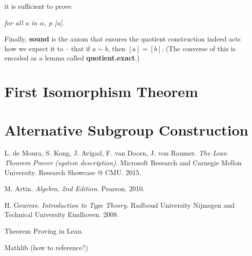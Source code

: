\documentclass[runningheads,a4paper]{llncs}
\renewcommand{\a}{\alpha}
\renewcommand{\-}{\setminus}
\begin{document}
it is sufficient to prove

\vspace{2 mm}
\hspace{2 em}\textit{for all a in $\a$, p [a]}.
\vspace{2 mm}

Finally, \textbf{sound} is the axiom that ensures the quotient construction indeed acts how we expect it to -- that if $a \sim b$, then $[a] = [b]$. (The converse of this is encoded as a lemma called \textbf{quotient.exact}.)


\section{First Isomorphism Theorem}

\section{Alternative Subgroup Construction}



\begin{thebibliography}{1}

 L. de Moura, S. Kong, J. Avigad, F. van Doorn, J. von Raumer. {\em The Lean Theorem Prover (system description).} Microsoft Research and Carnegie Mellon University. Research Showcase @ CMU. 2015.

 M. Artin. {\em Algebra, 2nd Edition.} Pearson. 2010.

 H. Geuvers. {\em Introduction to Type Theory.} Radboud University Nijmegen and Technical University Eindhoven. 2008.

 Theorem Proving in Lean.

 Mathlib (how to reference?)

\end{thebibliography}
\end{document}
